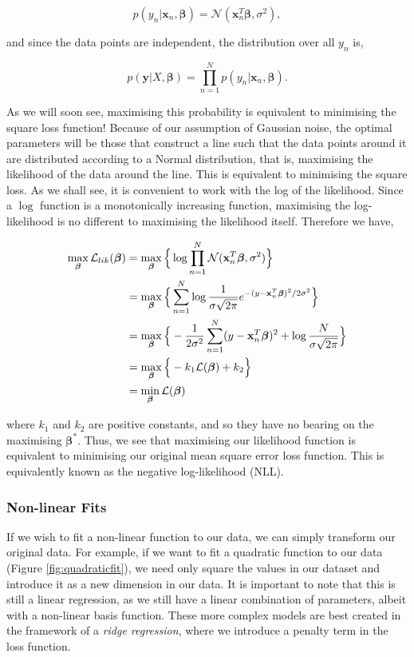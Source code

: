 \documentclass[11pt]{amsart}
\begin{document}
$$p(y_n|\mathbf{x}_n, \boldsymbol\beta) = \mathcal{N}(\mathbf{x}_n^T\boldsymbol\beta, \sigma^2),$$

and since the data points are independent, the distribution over all $y_n$ is,

$$p(\mathbf{y}|X, \boldsymbol\beta) = \prod_{n=1}^N p(y_n|\mathbf{x}_n, \boldsymbol\beta).$$

As we will soon see, maximising this probability is equivalent to minimising the square loss function! Because of our assumption of Gaussian noise, the optimal parameters will be those that construct a line such that the data points around it are distributed according to a Normal distribution, that is, maximising the likelihood of the data around the line. This is equivalent to minimising the square loss. As we shall see, it is convenient to work with the log of the likelihood. Since a $\log$ function is a monotonically increasing function, maximising the log-likelihood is no different to maximising the likelihood itself. Therefore we have,

\begin{align}
\max_{\boldsymbol\beta}\mathcal{L}_{lik}(\boldsymbol\beta) &= \max_{\boldsymbol\beta}\Big\{\log \prod_{n=1}^N \mathcal{N}(\mathbf{x}_n^T\boldsymbol\beta, \sigma^2)\Big\} \notag \\
&=\max_{\boldsymbol\beta}\Big\{\sum_{n=1}^N \log \frac{1}{\sigma\sqrt{2\pi}}e^{-(y - \mathbf{x}_n^T\boldsymbol\beta)^2/2\sigma^2}\Big\} \notag \\
&=\max_{\boldsymbol\beta}\Big\{-\frac{1}{2\sigma^2}\sum_{n=1}^N (y - \mathbf{x}_n^T\boldsymbol\beta)^2 + \log\frac{N}{\sigma\sqrt{2\pi}}\Big\} \notag \\
&=\max_{\boldsymbol\beta}\Big\{-k_1\mathcal{L}(\boldsymbol\beta) + k_2\Big\} \notag \\
&=\min_{\boldsymbol\beta}\mathcal{L}(\boldsymbol\beta)\notag
\end{align}

where $k_1$ and $k_2$ are positive constants, and so they have no bearing on the maximising $\boldsymbol\beta^*$. Thus, we see that maximising our likelihood function is equivalent to minimising our original mean square error loss function. This is equivalently known as the negative log-likelihood (NLL).

\subsubsection{Non-linear Fits}

If we wish to fit a non-linear function to our data, we can simply transform our original data. For example, if we want to fit a quadratic function to our data (Figure \ref{fig:quadraticfit}), we need only square the values in our dataset and introduce it as a new dimension in our data. It is important to note that this is still a linear regression, as we still have a linear combination of parameters, albeit with a non-linear basis function. These more complex models are best created in the framework of a \emph{ridge regression}, where we introduce a penalty term in the loss function.
\end{document}
